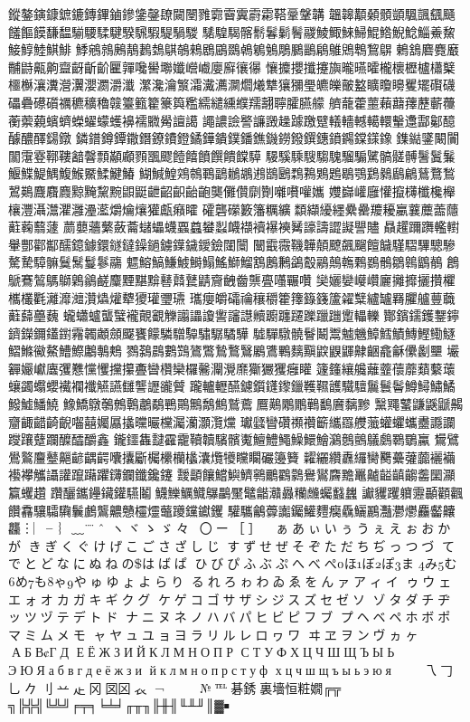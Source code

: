鏦鏊鏔鏮鏣鏕鏄鏎鏀鏒鎥鏧镽闚闛雡霩霫霬霨霦鞳鞷鞶韝
韞韟顜顙顝顗颿颽颻颾饈饇饃馦馧騚騕騥騝騤騛騢騠騧騣
騞騜騔髂鬋鬊鬎鬌鬷鯪鯫鯠鯞鯤鯦鯢鯰鯔鯗鯬鯜鯙鯥鯕鯡
鯚鵷鶁鶊鶄鶈鵱鶀鵸鶆鶋鶌鵽鵫鵴鵵鵰鵩鶅鵳鵻鶂鵯鵹鵿
鶇鵨麔麑黀黼鼭齀齁齍齖齗齘匷嚲嚵嚳壣孅巆巇廮廯忀忁
懹攗攖攕攓旟曨曣曤櫳櫰櫪櫨櫹櫱櫮櫯瀼瀵瀯瀷瀴瀱灂瀸
瀿瀺瀹瀪灀瀻瀳灁爓爔犨獽獼璺皫皪皾盭矌矎矏矍矲礥礣
礧礨礤礩禲穮穬穭竷籉籈籊籇籅糮繻繾纁纀羺翿聹臛臙艨
艩蘢藿蘁藾蘛蘀藶蘄蘉蘅蘌藽蠙蠐蠑蠗蠓蠖襣襦覹觷譠譪
譝譨譣譥譧譭趮躆躈躄轙轖轗轕轘轚邍酃酁醷醵醲醳鐋鐓
鏻鐠鐏鐔鏾鐕鐐鐨鐙鐍鏵鐀鏷鐇鐎鐖鐒鏺鐉鏸鐼鐊鏿鏼鐌
鏶鐑鐆闞闠闟霮霯鞹鞻韽韾顠顢顣顟飁飂饐饎饙饌饋饓騲
騴騱騬騪騶騩騮騸騭髇髊髆鬐鬒鬑鰋鰈鯷鰅鰒鯸鱀鰇鰎鰆
鰗鰔鰉鶟鶙鶤鶝鶒鶘鶐鶛鶠鶔鶜鶪鶗鶡鶚鶢鶨鶞鶣鶿鶩鶖
鶦鶧麙麛麚黥黤黧黦鼰鼮齛齠齞齝齙龑儺儹劘劗囃嚽嚾孈
孇巋巏廱懽攛欂櫼欃櫸欀灃灄灊灈灉灅灆爝爚爙獾甗癪矐
礭礱礯籔籓糲纊纇纈纋纆纍罍羻耰臝蘘蘪蘦蘟蘣蘜蘙蘧
蘮蘡蘠蘩蘞蘥蠩蠝蠛蠠蠤蠜蠫衊襭襩襮襫觺譹譸譅譺譻贐
贔趯躎躌轞轛轝酆酄酅醹鐿鐻鐶鐩鐽鐰鐹鐪鐷鐬鑀鐱闥闤
闣霵霺鞿韡顤飉飆飀饘饖騹騽驆驄驂驁騺騿髍鬕鬗鬘鬖鬺
魒鰫鰝鰜鰬鰣鰨鰩鰤鰡鶷鶶鶼鷁鷇鷊鷏鶾鷅鷃鶻鶵鷎鶹鶺
鶬鷈鶱鶭鷌鶳鷍鶲鹺麜黫黮黭鼛鼘鼚鼱齎齥齤龒亹囆囅囋
奱孋孌巕巑廲攡攠攦攢欋欈欉氍灕灖灗灒爞爟犩獿瓘瓕瓙
瓗癭皭礵禴穰穱籗籜籙籛籚糴糱纑罏羇臞艫蘴蘵蘳蘬蘲蘶
蠬蠨蠦蠪蠥襱覿覾觻譾讄讂讆讅譿贕躕躔躚躒躐躖躗轠轢
酇鑌鑐鑊鑋鑏鑇鑅鑈鑉鑆霿韣顪顩飋饔饛驎驓驔驌驏驈驊
驉驒驐髐鬙鬫鬻魖魕鱆鱈鰿鱄鰹鰳鱁鰼鰷鰴鰲鰽鰶鷛鷒鷞
鷚鷋鷐鷜鷑鷟鷩鷙鷘鷖鷵鷕鷝麶黰鼵鼳鼲齂齫龕龢儽劙壨
壧奲孍巘蠯彏戁戃戄攩攥斖曫欑欒欏毊灛灚爢玂玁玃癰矔
籧籦纕艬蘺虀蘹蘼蘱蘻蘾蠰蠲蠮蠳襶襴襳觾讌讎讋讈豅贙
躘轤轣醼鑢鑕鑝鑗鑞韄韅頀驖驙鬞鬟鬠鱒鱘鱐鱊鱍鱋鱕鱙
鱌鱎鷻鷷鷯鷣鷫鷸鷤鷶鷡鷮鷦鷲鷰鷢鷬鷴鷳鷨鷭黂黐黲
黳鼆鼜鼸鼷鼶齃齏齱齰齮齯囓囍孎屭攭曭曮欓灟灡灝灠爣
瓛瓥矕礸禷禶籪纗羉艭虃蠸蠷蠵衋讔讕躞躟躠躝醾醽釂鑫
鑨鑩雥靆靃靇韇韥驞髕魙鱣鱧鱦鱢鱞鱠鸂鷾鸇鸃鸆鸅鸀鸁
鸉鷿鷽鸄麠鼞齆齴齵齶囔攮斸欘欙欗欚灢爦犪矘矙礹籩籫
糶纚纘纛纙臠臡虆虇虈襹襺襼襻觿讘讙躥躤躣鑮鑭鑯鑱鑳
靉顲饟鱨鱮鱭鸋鸍鸐鸏鸒鸑麡黵鼉齇齸齻齺齹圞灦籯蠼趲
躦釃鑴鑸鑶鑵驠鬮鱴鱳鱱鱵鸔鸓黶鼊龤灨灥糷虪蠾蠽蠿
讞貜躩軉靋顳顴飌饡馫驤驦驧鬤鸕鸗齈戇欞爧虌躨钂钀钁
驩驨鸙虋讟钃鱹麷癵驫鱺鸝灩灪爩麤齾齉龘︙︳╴︴﹏¨
̈ˆ＾ヽヾゝゞ々〆〇ー［］
✽ぁあぃいぅうぇえぉおかが
きぎくぐけげこごさざしじ
すずせぜそぞただちぢっつづ
てでとどなにぬねのはばぱ
ひびぴふぶぷへべぺほぼぽま
みむめもゃやゅゆょよらり
るれろゎわゐゑをんァアィイ
ゥウェエォオカガキギクグ
ケゲコゴサザシジスズセゼソ
ゾタダチヂッツヅテデトド
ナニヌネノハバパヒビピフブ
プヘベペホボポマミムメモ
ャヤュユョヨラリルレロヮワ
ヰヱヲンヴヵヶАБВГД
ЕЁЖЗИЙКЛМНОПР
СТУФХЦЧШЩЪЫЬ
ЭЮЯабвгдеёжзи
йклмнопрстуф
хцчшщъыьэюя⇧↸
↹㇏乁𠃌乚𠂊刂䒑龰冈㘝龱𧘇
¬￢￤＇＂㈱№℡碁銹裏墻恒粧嫺╔╦
╗╠╬╣╚╩╝╒╤╕╘╧╛╓╥╖╟╫╢╙╨╜║▓￭


